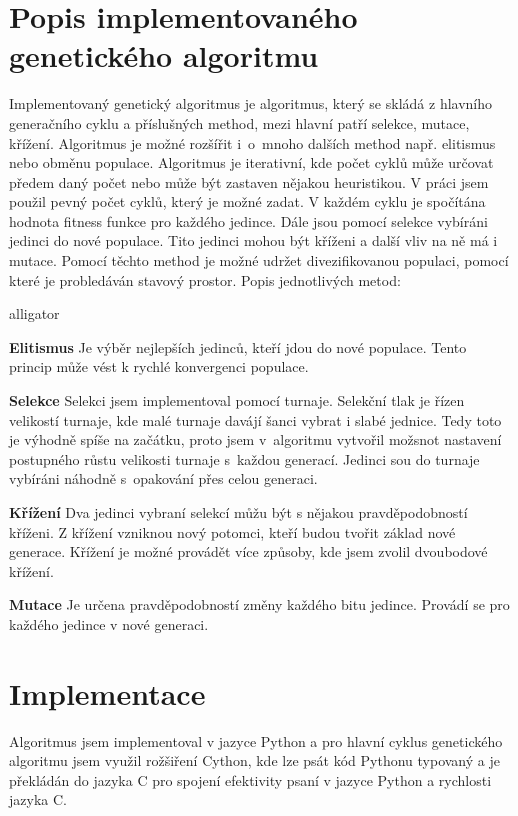 \documentclass[11pt]{article}
\begin{document}
\section{Popis implementovaného genetického algoritmu}\label{kap:popisALG}
Implementovaný genetický algoritmus je algoritmus, který se skládá z hlavního generačního cyklu a příslušných method, mezi hlavní patří selekce, mutace, křížení. Algoritmus je možné rozšířit i~o~mnoho dalších method např. elitismus nebo obměnu populace. Algoritmus je iterativní, kde počet cyklů může určovat předem daný počet nebo může být zastaven nějakou heuristikou. V práci jsem použil pevný počet cyklů, který je možné zadat. V každém cyklu je spočítána hodnota fitness funkce pro každého jedince. Dále jsou pomocí selekce vybíráni jedinci do nové populace. Tito jedinci mohou být kříženi a další vliv na ně má i mutace. Pomocí těchto method je možné udržet divezifikovanou populaci, pomocí které je probledáván stavový prostor. Popis jednotlivých metod:
\begin{labeling}{alligator}
\item[\textbf{Elitismus}] Je výběr nejlepších jedinců, kteří jdou do nové populace. Tento princip může vést k rychlé konvergenci populace.
\item[\textbf{Selekce}] Selekci jsem implementoval pomocí turnaje. Selekční tlak je řízen velikostí turnaje, kde malé turnaje davájí šanci vybrat i slabé jednice. Tedy toto je výhodně spíše na začátku, proto jsem v~algoritmu vytvořil možsnot nastavení postupného růstu velikosti turnaje s~každou generací. Jedinci sou do turnaje vybíráni náhodně s~opakování přes celou generaci. 
\item[\textbf{Křížení}] Dva jedinci vybraní selekcí můžu být s nějakou pravděpodobností kříženi. Z křížení vzniknou nový potomci, kteří budou tvořit základ nové generace. Křížení je možné provádět více způsoby, kde jsem zvolil dvoubodové křížení.
\item[\textbf{Mutace}] Je určena pravděpodobností změny každého bitu jedince. Provádí se pro každého jedince v nové generaci.

\end{labeling}
\section{Implementace}\label{kap:implementace}
Algoritmus jsem implementoval v jazyce Python a pro hlavní cyklus genetického algoritmu jsem využil rožšiření Cython, kde lze psát kód Pythonu typovaný a je překládán do jazyka C pro spojení efektivity psaní v jazyce Python a rychlosti jazyka C. 
\end{document}
